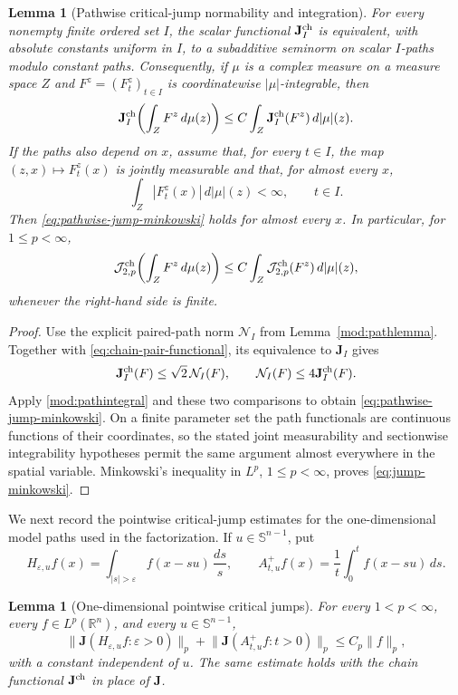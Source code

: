 \documentclass[11pt]{article}
\numberwithin{equation}{section}
\newtheorem{lemma}[theorem]{Lemma}
\theoremstyle{remark}
\theoremstyle{definition}
\newcommand{\R}{\mathbb R}
\newcommand{\Sph}{\mathbb S}
\newcommand{\norm}[1]{\lVert #1\rVert}
\newcommand{\NN}{\mathcal N}
\begin{document}
\begin{lemma}[Pathwise critical-jump normability and integration]
\label{lem:jumpnorm}
For every nonempty finite ordered set $I$, the scalar functional
$\mathbf J_I^{\rm ch}$ is equivalent, with absolute constants uniform in
$I$, to a subadditive seminorm on scalar $I$-paths modulo constant paths.
Consequently, if $\mu$ is a complex measure on a measure space $Z$ and
$F^z=(F_t^z)_{t\in I}$ is coordinatewise $|\mu|$-integrable, then
\begin{equation}\label{eq:pathwise-jump-minkowski}
 \mathbf J_I^{\rm ch}\!\left(\int_ZF^z\,d\mu(z)\right)
 \le C\int_Z\mathbf J_I^{\rm ch}(F^z)\,d|\mu|(z).
\end{equation}
If the paths also depend on $x$, assume that, for every $t\in I$, the map
$(z,x)\mapsto F_t^z(x)$ is jointly measurable and that, for almost every
$x$,
\[
 \int_Z|F_t^z(x)|\,d|\mu|(z)<\infty,
 \qquad t\in I.
\]
Then \eqref{eq:pathwise-jump-minkowski} holds for almost every $x$.  In
particular, for $1\le p<\infty$,
\begin{equation}\label{eq:jump-minkowski}
 \mathcal J^{\rm ch}_{2,p}\!\left(\int_ZF^z\,d\mu(z)\right)
 \le C\int_Z\mathcal J^{\rm ch}_{2,p}(F^z)\,d|\mu|(z),
\end{equation}
whenever the right-hand side is finite.
\end{lemma}

\begin{proof}
Use the explicit paired-path norm $\NN_I$ from Lemma~\ref{mod:pathlemma}.
Together with \eqref{eq:chain-pair-functional}, its equivalence to
$\mathbf J_I$ gives
\[
 \mathbf J_I^{\rm ch}(F)\le\sqrt2\,\NN_I(F),\qquad
 \NN_I(F)\le4\mathbf J_I^{\rm ch}(F).
\]
Apply \eqref{mod:pathintegral} and these two comparisons to obtain
\eqref{eq:pathwise-jump-minkowski}. On a finite parameter set the path
functionals are continuous functions of their coordinates, so the stated
joint measurability and sectionwise integrability hypotheses permit the
same argument almost everywhere in the spatial variable. Minkowski's
inequality in $L^p$, $1\le p<\infty$, proves \eqref{eq:jump-minkowski}.
\end{proof}

We next record the pointwise critical-jump estimates for the
one-dimensional model paths used in the factorization.  If
$u\in\Sph^{n-1}$, put
\[
 H_{\varepsilon,u}f(x)=\int_{|s|>\varepsilon}f(x-su)\,\frac{ds}{s},
 \qquad
 A^+_{t,u}f(x)=\frac1t\int_0^t f(x-su)\,ds.
\]

\begin{lemma}[One-dimensional pointwise critical jumps]
\label{lem:one-dimensional-inside-jump}
For every $1<p<\infty$, every $f\in L^p(\R^n)$, and every
$u\in\Sph^{n-1}$,
\begin{equation}\label{eq:one-dimensional-inside-jump}
 \norm{\mathbf J(H_{\varepsilon,u}f:\varepsilon>0)}_p
 +\norm{\mathbf J(A^+_{t,u}f:t>0)}_p
 \le C_p\norm f_p,
\end{equation}
with a constant independent of $u$. The same estimate holds with the
chain functional $\mathbf J^{\rm ch}$ in place of $\mathbf J$.
\end{lemma}
\end{document}
